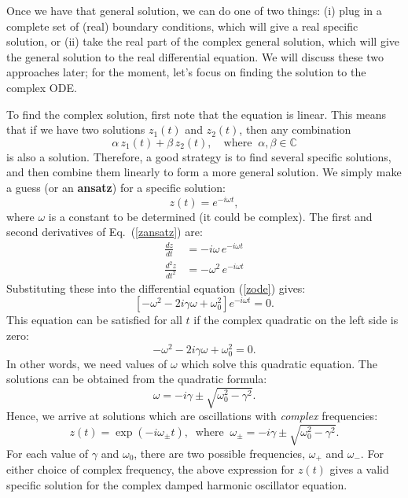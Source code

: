 \documentclass[10pt,a4paper]{article}
\begin{document}
Once we have that general solution, we can do one of two things: (i)
plug in a complete set of (real) boundary conditions, which will give
a real specific solution, or (ii) take the real part of the complex
general solution, which will give the general solution to the real
differential equation. We will discuss these two approaches later; for
the moment, let's focus on finding the solution to the complex ODE.

To find the complex solution, first note that the equation is linear.
This means that if we have two solutions $z_1(t)$ and $z_2(t)$, then
any combination
\begin{equation}
  \alpha \, z_1(t) + \beta \,z_2(t),\quad \mathrm{where}\;\; \alpha, \beta \in \mathbb{C}
\end{equation}
is also a solution. Therefore, a good strategy is to find several
specific solutions, and then combine them linearly to form a more
general solution. We simply make a guess (or an \textbf{ansatz}) for a
specific solution:
\begin{equation}
  z(t) = e^{-i\omega t}, \label{zansatz}
\end{equation}
where $\omega$ is a constant to be determined (it could be
complex). The first and second derivatives of Eq.~(\ref{zansatz}) are:
\begin{align}
  \frac{dz}{dt} &= -i\omega\, e^{-i\omega t} \\
  \frac{d^2z}{dt^2} &= -\omega^2\, e^{-i\omega t}
\end{align}
Substituting these into the differential equation (\ref{zode}) gives:
\begin{equation}
  \left[-\omega^2 - 2i\gamma \omega + \omega_0^2 \right] e^{-i\omega t} = 0.
\end{equation}
This equation can be satisfied for all $t$ if the complex quadratic on
the left side is zero:
\begin{equation}
  -\omega^2 - 2i\gamma \omega + \omega_0^2 = 0.
\end{equation}
In other words, we need values of $\omega$ which solve this quadratic
equation. The solutions can be obtained from the quadratic formula:
\begin{equation}
  \omega = -i\gamma \pm \sqrt{\omega_0^2 - \gamma^2}.
\end{equation}
Hence, we arrive at solutions which are oscillations with
\emph{complex} frequencies:
\begin{equation}
z(t) = \exp\left(-i\omega_\pm t\right), \;\;\mathrm{where}\;\; \omega_\pm = -i\gamma \pm \sqrt{\omega_0^2 - \gamma^2}.
\end{equation}
For each value of $\gamma$ and $\omega_0$, there are two possible
frequencies, $\omega_+$ and $\omega_-$. For either choice of complex
frequency, the above expression for $z(t)$ gives a valid specific
solution for the complex damped harmonic oscillator equation.
\end{document}
